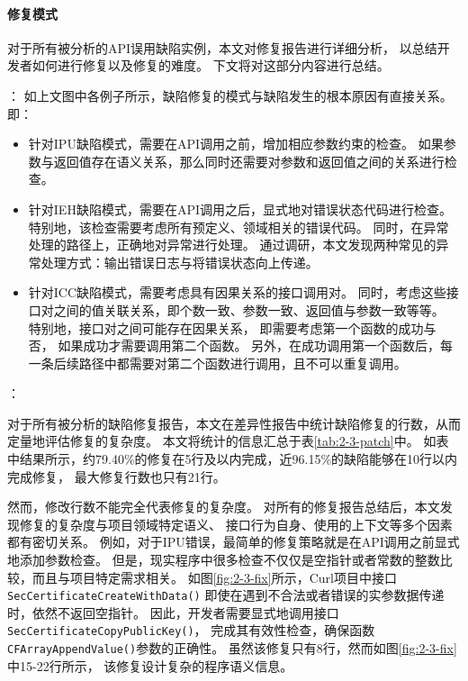 \paragraph{修复模式}
对于所有被分析的API误用缺陷实例，本文对修复报告进行详细分析，
以总结开发者如何进行修复以及修复的难度。
下文将对这部分内容进行总结。

{}：
如上文图中各例子所示，缺陷修复的模式与缺陷发生的根本原因有直接关系。即：
\begin{itemize}
	\item 针对IPU缺陷模式，需要在API调用之前，增加相应参数约束的检查。
	如果参数与返回值存在语义关系，那么同时还需要对参数和返回值之间的关系进行检查。
	\item 针对IEH缺陷模式，需要在API调用之后，显式地对错误状态代码进行检查。
	特别地，该检查需要考虑所有预定义、领域相关的错误代码。
	同时，在异常处理的路径上，正确地对异常进行处理。
	通过调研，本文发现两种常见的异常处理方式：输出错误日志与将错误状态向上传递。
	\item 针对ICC缺陷模式，需要考虑具有因果关系的接口调用对。
	同时，考虑这些接口对之间的值关联关系，即个数一致、参数一致、返回值与参数一致等等。
	特别地，接口对之间可能存在因果关系，
	即需要考虑第一个函数的成功与否，
	如果成功才需要调用第二个函数。
	另外，在成功调用第一个函数后，每一条后续路径中都需要对第二个函数进行调用，且不可以重复调用。
\end{itemize}

{}：

对于所有被分析的缺陷修复报告，本文在差异性报告中统计缺陷修复的行数，从而定量地评估修复的复杂度。
本文将统计的信息汇总于表\ref{tab:2-3-patch}中。
如表中结果所示，约79.40\%的修复在5行及以内完成，近96.15\%的缺陷能够在10行以内完成修复，
最大修复行数也只有21行。



然而，修改行数不能完全代表修复的复杂度。
对所有的修复报告总结后，本文发现修复的复杂度与项目领域特定语义、
接口行为自身、使用的上下文等多个因素都有密切关系。
例如，对于IPU错误，最简单的修复策略就是在API调用之前显式地添加参数检查。
但是，现实程序中很多检查不仅仅是空指针或者常数的整数比较，而且与项目特定需求相关。
如图\ref{fig:2-3-fix}所示，Curl项目中接口\texttt{SecCertificateCreateWithData()}
即使在遇到不合法或者错误的实参数据传递时，依然不返回空指针。
因此，开发者需要显式地调用接口\texttt{SecCertificateCopyPublicKey()}，
完成其有效性检查，确保函数\texttt{CFArrayAppendValue()}参数的正确性。
虽然该修复只有8行，然而如图\ref{fig:2-3-fix}中15-22行所示，
该修复设计复杂的程序语义信息。


